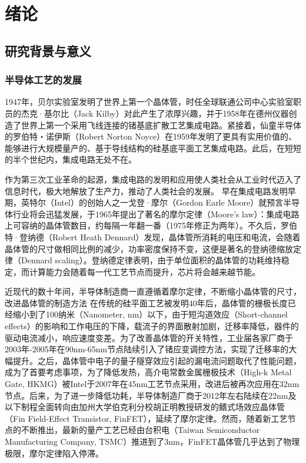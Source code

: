 \chapter{绪论}

\section{研究背景与意义}

\subsection{半导体工艺的发展}

1947年，贝尔实验室发明了世界上第一个晶体管，时任全球联通公司中心实验室职员的杰克·基尔比（Jack Kilby）对此产生了浓厚兴趣，并于1958年在德州仪器创造了世界上第一个采用飞线连接的锗基底扩散工艺集成电路。紧接着，仙童半导体的罗伯特・诺伊斯（Robert Norton Noyce）在1959年发明了更具有实用价值的、能够进行大规模量产的、基于导线结构的硅基底平面工艺集成电路。此后，在短短的半个世纪内，集成电路无处不在。

作为第三次工业革命的起源，集成电路的发明和应用使人类社会从工业时代迈入了信息时代，极大地解放了生产力，推动了人类社会的发展。
早在集成电路发明早期，英特尔（Intel）的创始人之一戈登·摩尔（Gordon Earle Moore）就预言半导体行业将会迅猛发展，于1965年提出了著名的摩尔定律（Moore's law）\cite{moore_law_0}：集成电路上可容纳的晶体管数目，约每隔一年翻一番（1975年修正为两年\cite{moore_law_1}）。不久后，罗伯特·登纳德（Robert Heath Dennard）发现，晶体管所消耗的电压和电流，会随着晶体管的尺寸做相同比例的减少，功率密度保持不变，这便是著名的登纳德缩放定律（Dennard scaling）\cite{dennard_scaling}。登纳德定律表明，由于单位面积的晶体管的功耗维持稳定，而计算能力会随着每一代工艺节点而提升，芯片将会越来越节能。

近现代的数十年间，半导体制造商一直遵循着摩尔定律，不断缩小晶体管的尺寸，改进晶体管的制造方法%
在传统的硅平面工艺被发明40年后，晶体管的栅极长度已经缩小到了100纳米（Nanometer, nm）以下\cite{90nm_uniaxial_strained}，由于短沟道效应（Short-channel effects）的影响\cite{short-channel_effect}和工作电压的下降，载流子的界面散射加剧，迁移率降低，器件的驱动电流减小，响应速度变差。为了改善晶体管的开关特性，工业届各家厂商于2003年-2005年在90nm-65nm节点陆续引入了锗应变调控方法\cite{90nm_ge_strained,65nm_strained}，实现了迁移率的大幅提升。之后，晶体管中电子的量子隧穿效应引起的漏电流问题取代了性能问题，成为了首要考虑事项，为了降低发热，高介电常数金属栅极技术（High-k Metal Gate, HKMG）被Intel于2007年在45nm工艺节点采用\cite{45nm_hkmg}，改进后被再次应用在32nm节点\cite{32nm_hkmg_2nd}。后来，为了进一步降低功耗，半导体制造厂商于2012年左右陆续在22nm及以下制程全面转向由加州大学伯克利分校胡正明教授研发的鳍式场效应晶体管（Fin Field-Effect Transistor, FinFET）\cite{FinFET}，延续了摩尔定律。然而，随着新工艺节点的不断推出，最新的量产工艺已经由台积电（Taiwan Semiconductor Manufacturing Company, TSMC）推进到了3nm，FinFET晶体管几乎达到了物理极限，摩尔定律陷入停滞。

